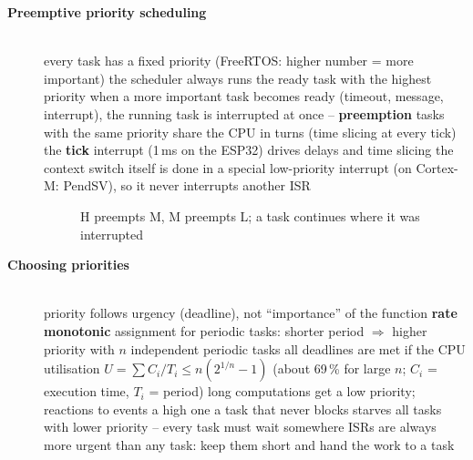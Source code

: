 \begin{description}
\item[{\rot\bf Preemptive priority scheduling}]~\\[-\lblskip]
\bi
	\ite every task has a fixed priority (FreeRTOS: higher number = more important)
	\ite the scheduler always runs the ready task with the highest priority
	\ite when a more important task becomes ready (timeout, message, interrupt), the running task is interrupted at once -- \textbf{preemption}
	\ite tasks with the same priority share the CPU in turns (time slicing at every tick)
	\ite the \textbf{tick} interrupt (1\,ms on the ESP32) drives delays and time slicing
	\ite the context switch itself is done in a special low-priority interrupt (on Cortex-M: PendSV), so it never interrupts another ISR
\ei
\begin{figure}[!hbtp]
\begin{center}
\caption{H preempts M, M preempts L; a task continues where it was interrupted}
\end{center}
\end{figure}
\os{\newpage}

\item[{\rot\bf Choosing priorities}]~\\[-\lblskip]
\bi
	\ite priority follows urgency (deadline), not ``importance'' of the function
	\ite \textbf{rate monotonic} assignment for periodic tasks: shorter period $\Rightarrow$ higher priority
	\bi
		\ite with $n$ independent periodic tasks all deadlines are met if the CPU utilisation $U = \sum C_i/T_i \le n(2^{1/n}-1)$ (about 69\,\% for large $n$; $C_i$ = execution time, $T_i$ = period)
	\ei
	\ite long computations get a low priority; reactions to events a high one
	\ite a task that never blocks starves all tasks with lower priority -- every task must wait somewhere
	\ite ISRs are always more urgent than any task: keep them short and hand the work to a task
\ei
\os{\newpage}


\end{description}

